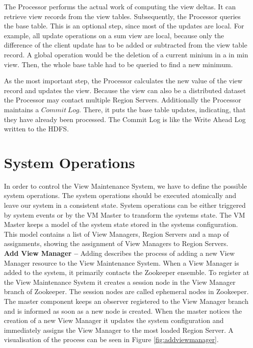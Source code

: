 \documentclass[11pt,a4paper,bibtotoc,idxtotoc,headsepline,footsepline,footexclude,BCOR12mm,DIV13]{scrbook}
\begin{document}
The Processor performs the actual work of computing the view deltas. It can retrieve view records from the view tables. Subsequently, the Processor queries the base table. This is an optional step, since most of the updates are local. For example, all update operations on a sum view are local, because only the difference of the client update has to be added or subtracted from the view table record. A global operation would be the deletion of a current minium in a in min view. Then, the whole base table had to be queried to find a new minimum. 

As the most important step, the Processor calculates the new value of the view record and updates the view. Because the view can also be a distributed dataset the Processor may contact multiple Region Servers. Additionally the Processor maintains a $Commit\:Log$. There, it puts the base table updates, indicating, that they have already been processed. The Commit Log is like the Write Ahead Log written to the HDFS.

\section{System Operations}
\label{sec:systemoperations}

In order to control the View Maintenance System, we have to define the possible system operations. The system operations should be executed atomically and leave our system in a consistent state. System operations can be either triggered by system events or by the VM Master to transform the systems state. The VM Master keeps a model of the system state stored in the systems configuration. This model contains a list of View Managers, Region Servers and a map of assignments, showing the assignment of View Managers to Region Servers.\\

\noindent  
\textbf{Add View Manager -- }Adding describes the process of adding a new View Manager resource to the View Maintenance System. When a View Manager is added to the system, it primarily contacts the Zookeeper ensemble. To register at the View Maintenance System it creates a session node in the View Manager branch of Zookeeper. The session nodes are called ephemeral nodes in Zookeeper. The master component keeps an observer registered to the View Manager branch and is informed as soon as a new node is created. When the master notices the creation of a new View Manager it updates the system configuration and immediately assigns the View Manager to the most loaded Region Server. A visualisation of the process can be seen in Figure \ref{fig:addviewmanager}.\\
\end{document}
